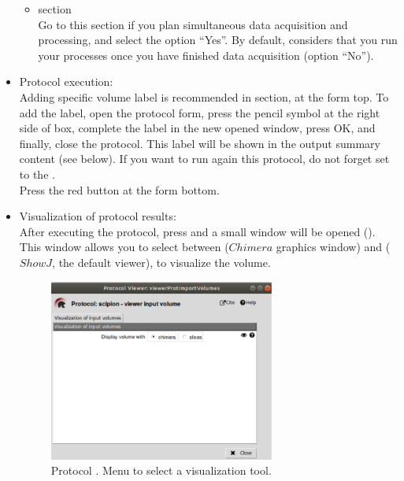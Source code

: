 \begin{itemize}
\begin{itemize}
  \item {} section\\
  
  Go to this section if you plan simultaneous data acquisition and processing, and select the option ``Yes''. By default, \scipion considers that you run your processes once you have finished data acquisition (option ``No'').\\
  
  \end{itemize}
  \item Protocol execution:\\
  
  Adding specific volume label is recommended in  section, at the form top. To add the label, open the protocol form, press the pencil symbol at the right side of  box, complete the label in the new opened window, press OK, and finally, close the protocol. This label will be shown in the output summary content (see below). If you want to run again this protocol, do not forget set to  the .\\
  Press the  red button at the form bottom.\\
  
  \item Visualization of protocol results:\\
  
  After executing the protocol, press  and a small window will be opened (). This window allows you to select between  ($Chimera$ graphics window) and  ($ShowJ$, the default \scipion viewer), to visualize the volume.
  
  \begin{figure}[H]
    \centering 
    \captionsetup{width=.7\linewidth} 
    \includegraphics[width=0.70\textwidth]{Images_appendix/Fig101.pdf}
    \caption{Protocol . Menu to select a visualization tool.}
    \label{fig:app_protocol_volume_2}
   \end{figure}
   

\end{itemize}
